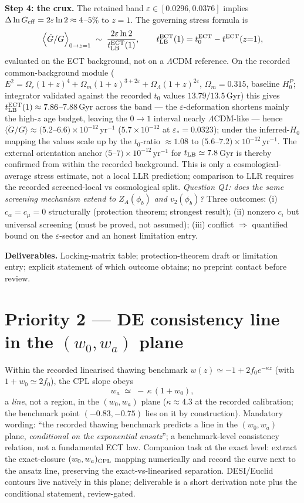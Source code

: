 \documentclass[11pt,a4paper]{article}
\begin{document}
\textbf{Step 4: the crux.} The retained band $\varepsilon\in[0.0296,0.0376]$ implies
$\Delta\ln G_{\rm eff}=2\varepsilon\ln 2\approx4$--$5\%$ to $z=1$. The governing
stress formula is
\[
\Big\langle \dot G/G \Big\rangle_{0\to z=1}
\;\sim\; \frac{2\varepsilon\ln 2}{t_{\rm LB}^{\rm ECT}(1)},\qquad
t_{\rm LB}^{\rm ECT}(1)=t_0^{\rm ECT}-t^{\rm ECT}(z{=}1),
\]
evaluated on the ECT background, not on a $\Lambda$CDM reference. On the recorded
common-background module ($E^2=\Omega_r(1+z)^4+\Omega_m(1+z)^{3+2\varepsilon}
+\Omega_\Lambda(1+z)^{2\varepsilon}$, $\Omega_m=0.315$, baseline $H_0^P$; integrator
validated against the recorded $t_0$ values $13.79/13.5$\,Gyr) this gives
$t_{\rm LB}^{\rm ECT}(1)\approx7.86$--$7.88$\,Gyr across the band --- the
$\varepsilon$-deformation shortens mainly the high-$z$ age budget, leaving the
$0\!\to\!1$ interval nearly $\Lambda$CDM-like --- hence
$\langle\dot G/G\rangle\approx(5.2$--$6.6)\times10^{-12}$\,yr$^{-1}$
($5.7\times10^{-12}$ at $\varepsilon_*=0.0323$); under the inferred-$H_0$ mapping
the values scale up by the $t_0$-ratio $\approx1.08$ to
$(5.6$--$7.2)\times10^{-12}$\,yr$^{-1}$. The external orientation anchor
$(5$--$7)\times10^{-12}$\,yr$^{-1}$ for $t_{\rm LB}\simeq7.8$\,Gyr is thereby
confirmed from within the recorded background. This is only a cosmological-average
stress estimate, not a local LLR prediction; comparison to LLR requires the recorded
screened-local vs cosmological split. \emph{Question
Q1: does the same screening mechanism extend to $Z_A(\phi_b)$ and $v_2(\phi_b)$?}
Three outcomes: (i) $c_\alpha=c_\mu=0$ structurally (protection theorem; strongest
result); (ii) nonzero $c_i$ but universal screening (must be proved, not assumed);
(iii) conflict $\Rightarrow$ quantified bound on the $\varepsilon$-sector and an
honest limitation entry.

\textbf{Deliverables.} Locking-matrix table; protection-theorem draft or limitation
entry; explicit statement of which outcome obtains; no preprint contact before
review.

\section{Priority 2 --- DE consistency line in the $(w_0,w_a)$ plane}
\label{sec:deline}
Within the recorded linearised thawing benchmark
$w(z)\simeq-1+2f_0e^{-\kappa z}$ (with $1+w_0\simeq2f_0$), the CPL slope obeys
\[
w_a\;\simeq\;-\,\kappa\,(1+w_0),
\]
a \emph{line}, not a region, in the $(w_0,w_a)$ plane ($\kappa\approx4.3$ at the
recorded calibration; the benchmark point $(-0.83,-0.75)$ lies on it by construction).
Mandatory wording: ``the recorded thawing benchmark predicts a line in the
$(w_0,w_a)$ plane, \emph{conditional on the exponential ansatz}''; a benchmark-level
consistency relation, not a fundamental ECT law. Companion task at the exact level:
extract the exact-closure $(w_0,w_a)_{\rm CPL}$ mapping numerically and record the
curve next to the ansatz line, preserving the exact-vs-linearised separation.
DESI/Euclid contours live natively in this plane; deliverable is a short derivation
note plus the conditional statement, review-gated.
\end{document}
